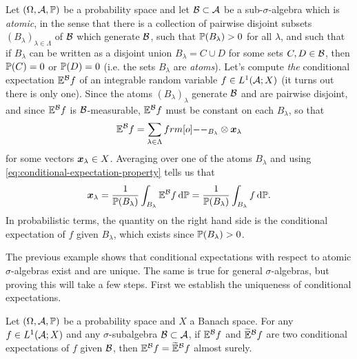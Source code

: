 \begin{example}\label{eg:atomic-CE}
  Let $(\Omega,\mc{A},\P)$ be a probability space and let $\mc{B} \subset \mc{A}$ be a sub-$\sigma$-algebra which is \emph{atomic}, in the sense that there is a collection of pairwise disjoint subsets $(B_\lambda)_{\lambda \in \Lambda}$ of $\mc{B}$ which generate $\mc{B}$, such that $\P(B_{\lambda}) > 0$ for all $\lambda$, and such that if $B_\lambda$ can be written as a disjoint union $B_\lambda = C \cup D$ for some sets $C,D \in \mc{B}$, then $\P(C) = 0$ or $\P(D) = 0$ (i.e. the sets $B_\lambda$ are \emph{atoms}).
  Let's compute \emph{the} conditional expectation $\E^{\mc{B}}f$ of an integrable random variable $f \in L^1(\mc{A};X)$ (it turns out there is only one).
  Since the atoms $(B_\lambda)_{\lambda}$ generate $\mc{B}$ and are pairwise disjoint, and since $\E^{\mc{B}}f$ is $\mc{B}$-measurable, $\E^{\mc{B}}f$ must be constant on each $B_\lambda$, so that
  \begin{equation*}
    \E^{\mc{B}} f = \sum_{\lambda \in \Lambda} \1_{B_\lambda} \otimes \mb{x}_\lambda
  \end{equation*}
  for some vectors $\mb{x}_{\lambda} \in X$.
  Averaging over one of the atoms $B_{\lambda}$ and using \eqref{eq:conditional-expectation-property} tells us that
  \begin{equation*}
    \begin{aligned}
      \mb{x}_\lambda = \frac{1}{\P(B_\lambda)} \int_{B_\lambda} \E^{\mc{B}} f \, \dd\P = \frac{1}{\P(B_\lambda)} \int_{B_\lambda} f \, \dd\P.
    \end{aligned}
  \end{equation*}
  In probabilistic terms, the quantity on the right hand side is the conditional expectation of $f$ given $B_\lambda$, which exists since $\P(B_\lambda) > 0$.
\end{example}

The previous example shows that conditional expectations with respect to atomic $\sigma$-algebras exist and are unique.
The same is true for general $\sigma$-algebras, but proving this will take a few steps.
First we establish the uniqueness of conditional expectations.

\begin{prop}\label{prop:CE-uniqueness}
  Let $(\Omega,\mc{A},\P)$ be a probability space and $X$ a Banach space.
  For any $f \in L^1(\mc{A};X)$ and any $\sigma$-subalgebra $\mc{B} \subset \mc{A}$, if $\E^{\mc{B}}f$ and $\td{\E}^{\mc{B}}f$ are two conditional expectations of $f$ given $\mc{B}$, then $\E^{\mc{B}}f = \td{\E}^{\mc{B}}f$ almost surely.
\end{prop}

